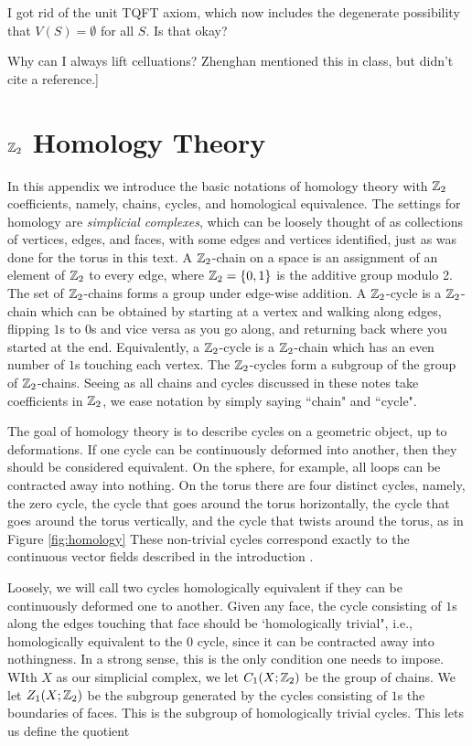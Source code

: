 \documentclass{article}
\theoremstyle{definition}
\numberwithin{figure}{section}
\begin{document}
I got rid of the unit TQFT axiom, which now includes the degenerate possibility that $V(S)=\emptyset$ for all $S$. Is that okay?

Why can I always lift celluations? Zhenghan mentioned this in class, but didn't cite a reference.]
\appendix

\section{$\mathbb{Z}_2$ Homology Theory}
\label{Homology}

In this appendix we introduce the basic notations of homology theory with $\mathbb{Z}_2$ coefficients, namely, chains, cycles, and homological equivalence. The settings for homology are \textit{simplicial complexes}, which can be loosely thought of as collections of vertices, edges, and faces, with some edges and vertices identified, just as was done for the torus in this text. A $\mathbb{Z}_2$-chain on a space is an assignment of an element of $\mathbb{Z}_2$ to every edge, where $\mathbb{Z}_2=\{0,1\}$ is the additive group modulo 2. The set of $\mathbb{Z}_2$-chains forms a group under edge-wise addition. A $\mathbb{Z}_2$-cycle is a $\mathbb{Z}_2$-chain which can be obtained by starting at a vertex and walking along edges, flipping $1$s to $0$s and vice versa as you go along, and returning back where you started at the end. Equivalently, a $\mathbb{Z}_2$-cycle is a $\mathbb{Z}_2$-chain which has an even number of $1$s touching each vertex. The $\mathbb{Z}_2$-cycles form a subgroup of the group of $\mathbb{Z}_2$-chains. Seeing as all chains and cycles discussed in these notes take coefficients in $\mathbb{Z}_2$, we ease notation by simply saying ``chain" and ``cycle".

The goal of homology theory is to describe cycles on a geometric object, up to deformations. If one cycle can be continuously deformed into another, then they should be considered equivalent. On the sphere, for example, all loops can be contracted away into nothing. On the torus there are four distinct cycles, namely, the zero cycle, the cycle that goes around the torus horizontally, the cycle that goes around the torus vertically, and the cycle that twists around the torus, as in Figure \ref{fig:homology} These non-trivial cycles correspond exactly to the continuous vector fields described in the introduction \cite{frankel1957homology}.

Loosely, we will call two cycles homologically equivalent if they can be continuously deformed one to another. Given any face, the cycle consisting of $1$s along the edges touching that face should be `homologically trivial", i.e., homologically equivalent to the $0$ cycle, since it can be contracted away into nothingness. In a strong sense, this is the only condition one needs to impose. WIth $X$ as our simplicial complex, we let $C_1(X;\mathbb{Z}_2)$ be the group of chains. We let $Z_1(X;\mathbb{Z}_2)$ be the subgroup generated by the cycles consisting of $1$s  the boundaries of faces. This is the subgroup of homologically trivial cycles. This lets us define the quotient
\end{document}
